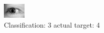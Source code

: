 \begin{figure}[h!]
\begin{center}
\includegraphics[width=0.60\columnwidth]{figures/ID3170_class_3_target_4.png}
\end{center}
\caption{ Classification: 3 actual target: 4}
\label{fig:ID3170_class_3_target_4}
\end{figure}
